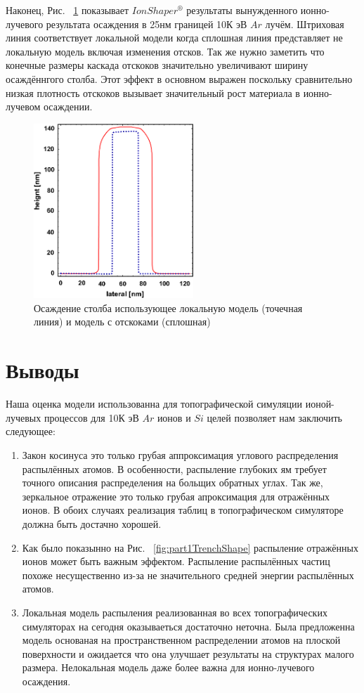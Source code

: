 \documentclass[a4paper,fontsize=12pt]{article}
\begin{document}
Наконец, Рис. ~\ref{fig:part1Deposition} показывает $IonShaper^{®}$ результаты вынужденного ионно-лучевого результата осаждения в 25нм границей 10К эВ $Ar$ лучём. Штриховая линия соответствует локальной модели когда сплошная линия представляет не локальную модель включая изменения отсков. Так же нужно заметить что конечные размеры каскада отскоков значительно увеличивают ширину осаждённгого столба. Этот эффект в основном выражен поскольку сравнительно низкая плотность отскоков вызывает значительный рост материала в ионно-лучевом осаждении.

\begin{figure}[h]
    \centering
    \includegraphics[width=6cm]{images/part1/5.eps}
    \caption{Осаждение столба использующее локальную модель (точечная линия) и модель с отскоками (сплошная)}
    \label{fig:part1Deposition}
\end{figure}

\section{Выводы}
Наша оценка модели использованна для топографической симуляции ионой-лучевых процессов для 10К эВ $Ar$ ионов и $Si$ целей позволяет нам заключить следующее:

\begin{enumerate}
  \item Закон косинуса это только грубая аппроксимация углового распределения распылённых атомов. В особенности, распыление глубоких ям требует точного описания распределения на больщих обратных углах. Так же, зеркальное отражение это только грубая апроксимация для отражённых ионов. В обоих случаях реализация таблиц в топографическом симуляторе должна быть достачно хорошей.
  \item Как было показынно на Рис. ~\ref{fig:part1TrenchShape} распыление отражённых ионов может быть важным эффектом. Распыление распылённых частиц похоже несущественно из-за не значительного средней энергии распылённых атомов.
  \item Локальная модель распыления реализованная во всех топографических симуляторах на сегодня оказываеться достаточно неточна. Была предложенна модель основаная на пространственном распределении атомов на плоской поверхности и ожидается что она улучшает результаты на структурах малого размера. Нелокальная модель даже более важна для ионно-лучевого осаждения.
\end{enumerate}
\end{document}
